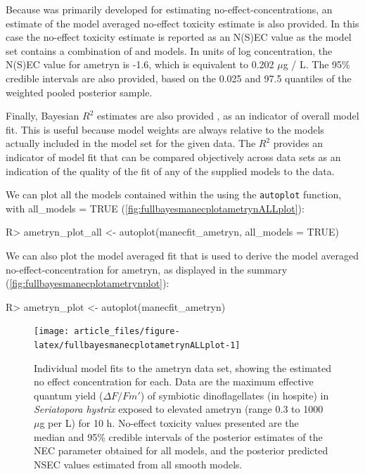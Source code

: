 \documentclass[
  shortnames]{jss}
\begin{document}
Because  was primarily developed for estimating no-effect-concentrations, an estimate of the model averaged no-effect toxicity estimate is also provided. In this case the no-effect toxicity estimate is reported as an N(S)EC value as the model set contains a combination of  and  models. In units of log concentration, the N(S)EC value for ametryn is -1.6, which is equivalent to 0.202 \(\mu\)g / L. The 95\% credible intervals are also provided, based on the 0.025 and 97.5 quantiles of the weighted pooled posterior sample.

Finally, Bayesian \(R^2\) estimates are also provided \citep{gelman2019}, as an indicator of overall model fit. This is useful because model weights are always relative to the models actually included in the model set for the given data. The \(R^2\) provides an indicator of model fit that can be compared objectively across data sets as an indication of the quality of the fit of any of the supplied models to the data.

We can plot all the models contained within the  using the \texttt{autoplot} function, with all\_models = TRUE (\autoref{fig:fullbayesmanecplotametrynALLplot}):

\begin{CodeChunk}
\begin{CodeInput}
R> ametryn_plot_all <- autoplot(manecfit_ametryn, all_models = TRUE)
\end{CodeInput}
\end{CodeChunk}

We can also plot the model averaged fit that is used to derive the model averaged no-effect-concentration for ametryn, as displayed in the summary (\autoref{fig:fullbayesmanecplotametrynplot}):

\begin{CodeChunk}
\begin{CodeInput}
R> ametryn_plot <- autoplot(manecfit_ametryn)
\end{CodeInput}
\end{CodeChunk}

\begin{CodeChunk}
\begin{figure}[!ht]

{\centering \texttt{[image: article\_files/figure-latex/fullbayesmanecplotametrynALLplot-1]} 

}

\caption{Individual model fits to the ametryn data set, showing the estimated no effect concentration for each. Data are the maximum effective quantum yield ($\Delta F / Fm'$) of symbiotic dinoflagellates (in hospite) in \textit{Seriatopora hystrix} exposed to elevated ametryn (range 0.3 to 1000 $\mu$g per L) for 10 h. No-effect toxicity values presented are the median and 95\% credible intervals of the posterior estimates of the NEC parameter obtained for all  models, and the posterior predicted NSEC values estimated from all smooth  models.}\label{fig:fullbayesmanecplotametrynALLplot}
\end{figure}
\end{CodeChunk}
\end{document}
